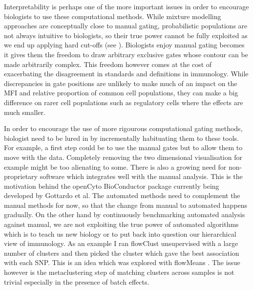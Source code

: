 Interpretability is perhaps one of the more important issues in order to encourage biologists to use these computational methods.
While mixture modelling approaches are conceptually close to manual gating, probabilistic populations are not always intuitive to biologists,
so their true power cannot be fully exploited as we end up applying hard cut-offs (see ).
Biologists enjoy manual gating becomes it gives them the freedom to draw arbitrary exclusive gates whose contour can be made arbitrarily complex.
This freedom however comes at the cost of exacerbating the disagreement in standards and definitions in immunology.
While discrepancies in gate positions are unlikely to make much of an impact on the MFI and relative proportion of common cell populations,
they can make a big difference on rarer cell populations such as regulatory cells where the effects are much smaller.

In order to encourage the use of more rigourous computational gating methods, biologist need to be lured in by incrementally habituating them to these tools.
For example, a first step could be to use the manual gates but to allow them to move with the data.
Completely removing the two dimensional visualisation for example might be too alienating to some.
There is also a growing need for non-proprietary software which integrates well with the manual analysis.
This is the motivation behind the openCyto BioConductor package currently being developed by Gottardo et al.
The automated methods need to complement the manual methods for now, so that the change from manual to automated happens gradually.
On the other hand by continuously benchmarking automated analysis against manual, we are not exploiting the true power of automated algorithms which is to teach us new biology or to put back into question our hierarchical view of immunology.
As an example I ran flowClust unsupervised with a large number of clusters and then picked the cluster which gave the best association with each SNP.
This is an idea which was explored with flowMeans \citep{Aghaeepour:2010fv}.
The issue however is the metaclustering step of matching clusters across samples is not trivial especially in the presence of batch effects.


